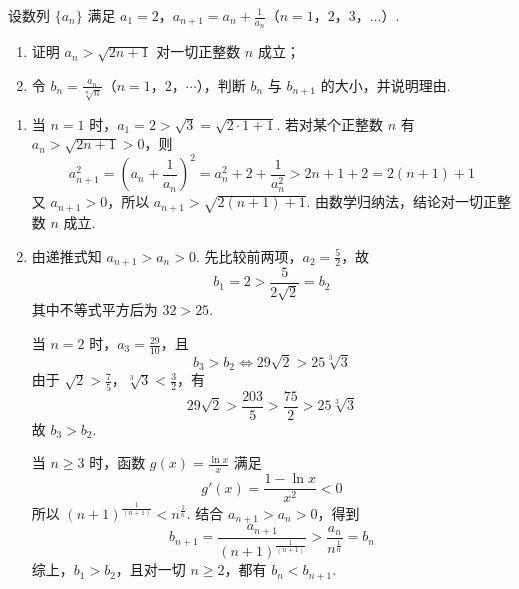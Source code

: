 \begin{problem}
设数列 \(\{a_n\}\) 满足 \(a_1=2\)，\(a_{n+1}=a_n+\frac{1}{a_n}\)（\(n=1\)，\(2\)，\(3\)，\(\ldots\)）.

\begin{enumerate}
\item 证明 \(a_n>\sqrt{2n+1}\) 对一切正整数 \(n\) 成立；
\item 令 \(b_n=\frac{a_n}{\sqrt[n]{n}}\)（\(n=1\)，\(2\)，\(\cdots\)），判断 \(b_n\) 与 \(b_{n+1}\) 的大小，并说明理由.
\end{enumerate}
\end{problem}

\begin{solution}
\begin{enumerate}
\item 当 \(n=1\) 时，\(a_1=2>\sqrt{3}=\sqrt{2\cdot1+1}\). 若对某个正整数 \(n\) 有 \(a_n>\sqrt{2n+1}>0\)，则
\[
a_{n+1}^2=\left(a_n+\frac{1}{a_n}\right)^2=a_n^2+2+\frac{1}{a_n^2}>2n+1+2=2(n+1)+1\]
又 \(a_{n+1}>0\)，所以 \(a_{n+1}>\sqrt{2(n+1)+1}\). 由数学归纳法，结论对一切正整数 \(n\) 成立.

\item 由递推式知 \(a_{n+1}>a_n>0\). 先比较前两项，\(a_2=\frac52\)，故
\[
b_1=2>\frac{5}{2\sqrt2}=b_2
\]
其中不等式平方后为 \(32>25\).

当 \(n=2\) 时，\(a_3=\frac{29}{10}\)，且
\[
b_3>b_2\Longleftrightarrow29\sqrt2>25\sqrt[3]{3}\]
由于 \(\sqrt2>\frac75\)，\(\sqrt[3]{3}<\frac32\)，有
\[
29\sqrt2>\frac{203}{5}>\frac{75}{2}>25\sqrt[3]{3}
\]
故 \(b_3>b_2\).

当 \(n\geqslant3\) 时，函数 \(g(x)=\frac{\ln x}{x}\) 满足
\[
g'(x)=\frac{1-\ln x}{x^2}<0\]
所以 \((n+1)^{\frac{1}{(n+1)}}<n^{\frac{1}{n}}\). 结合 \(a_{n+1}>a_n>0\)，得到
\[
b_{n+1}=\frac{a_{n+1}}{(n+1)^{\frac{1}{(n+1)}}}>\frac{a_n}{n^{\frac{1}{n}}}=b_n\]
综上，\(b_1>b_2\)，且对一切 \(n\geqslant2\)，都有 \(b_n<b_{n+1}\).
\end{enumerate}
\end{solution}
